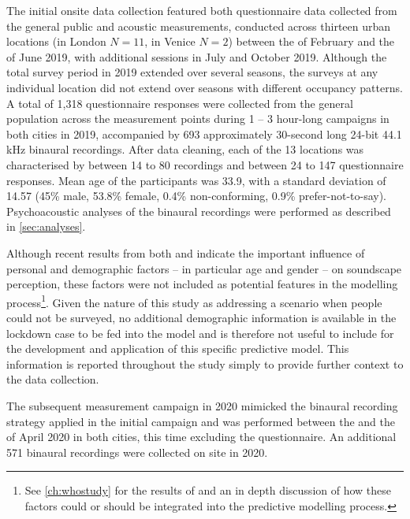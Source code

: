    The initial onsite data collection featured both questionnaire data collected from the general public and acoustic measurements, conducted across thirteen urban locations (in London $N=11$, in Venice $N=2$) between the  of February and the  of June 2019, with additional sessions in July and October 2019. Although the total survey period in 2019 extended over several seasons, the surveys at any individual location did not extend over seasons with different occupancy patterns. A total of 1,318 questionnaire responses were collected from the general population across the measurement points during 1 -- 3 hour-long campaigns in both cities in 2019, accompanied by 693 approximately 30-second long 24-bit 44.1 kHz binaural recordings. After data cleaning, each of the 13 locations was characterised by between 14 to 80 recordings and between 24 to 147 questionnaire responses. Mean age of the participants was 33.9, with a standard deviation of 14.57 (45\% male, 53.8\% female, 0.4\% non-conforming, 0.9\% prefer-not-to-say). Psychoacoustic analyses of the binaural recordings were performed as described in \cref{sec:analyses}.

   Although recent results from both \citet{Tarlao2020Investigating} and \citet{Erfanian2021Psychological} indicate the important influence of personal and demographic factors -- in particular age and gender -- on soundscape perception, these factors were not included as potential features in the modelling process\footnote{See \cref{ch:whostudy} for the results of \citet{Erfanian2021Psychological} and an in depth discussion of how these factors could or should be integrated into the predictive modelling process.}. Given the nature of this study as addressing a scenario when people could not be surveyed, no additional demographic information is available in the lockdown case to be fed into the model and is therefore not useful to include for the development and application of this specific predictive model. This information is reported throughout the study simply to provide further context to the data collection.

   The subsequent measurement campaign in 2020 mimicked the binaural recording strategy applied in the initial campaign and was performed between the  and the  of April 2020 in both cities, this time excluding the questionnaire. An additional 571 binaural recordings were collected on site in 2020.


